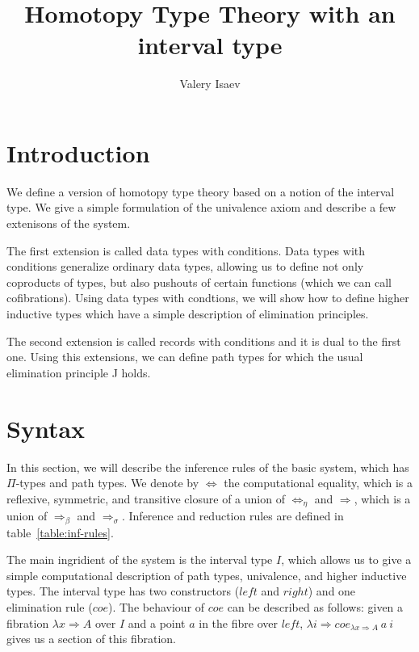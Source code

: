 \documentclass[8pt]{amsart}
\theoremstyle{definition}
\theoremstyle{remark}
\newcommand{\red}{\Rightarrow}
\newcommand{\deq}{\Leftrightarrow}
\numberwithin{figure}{section}
\begin{document}
\title{Homotopy Type Theory with an interval type}

\author{Valery Isaev}


\maketitle

\section{Introduction}

We define a version of homotopy type theory based on a notion of the interval type.
We give a simple formulation of the univalence axiom and describe a few extenisons of the system.

The first extension is called data types with conditions.
Data types with conditions generalize ordinary data types, allowing us to define not only coproducts of types, but also pushouts of certain functions (which we can call cofibrations).
Using data types with condtions, we will show how to define higher inductive types which have a simple description of elimination principles.

The second extension is called records with conditions and it is dual to the first one.
Using this extensions, we can define path types for which the usual elimination principle J holds.

\section{Syntax}

In this section, we will describe the inference rules of the basic system, which has $\Pi$-types and path types.
We denote by $\deq$ the computational equality, which is a reflexive, symmetric, and transitive closure of a union of $\deq_\eta$ and $\red$, which is a union of $\red_\beta$ and $\red_\sigma$.
Inference and reduction rules are defined in table~\ref{table:inf-rules}.

The main ingridient of the system is the interval type $I$, which allows us to give a simple computational description of path types, univalence, and higher inductive types.
The interval type has two constructors ($left$ and $right$) and one elimination rule ($coe$).
The behaviour of $coe$ can be described as follows:
given a fibration $\lambda x \red A$ over $I$ and a point $a$ in the fibre over $left$, $\lambda i \red coe_{\lambda x \red A}\ a\ i$ gives us a section of this fibration.
\end{document}
